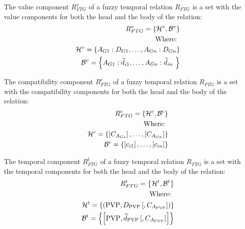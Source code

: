 \begin{definition}
\label{def:value-component}
The value component $R^{v}_{FTG}$ of a fuzzy temporal relation $R_{FTG}$ is a set with the value components for both the head and the body of the relation:
\begin{align}
\label{eq:value-component}
R^{v}_{FTG} = \left \lbrace \mathcal{H}^{v},\mathcal{B}^{v} \right \rbrace \\
\nonumber
\text{Where: } \\
\nonumber
\mathcal{H}^{v} = \left \lbrace A_{G1}:D_{G1}, \ldots,  A_{Gn}:D_{Gn} \right \rbrace \\
\nonumber
\mathcal{B}^ {v} = \left \lbrace A_{G1}:\widetilde{d}_{i1}, \ldots,  A_{Gn}:\widetilde{d}_{in}\ \right \rbrace \\
\end{align}
\end{definition}

\begin{definition}
\label{def:compatibility-component}
The compatibility component $R^{c}_{FTG}$ of a fuzzy temporal relation $R_{FTG}$ is a set with the compatibility components for both the head and the body of the relation:
\begin{align}
\label{eq:compatibility-component}
R^{c}_{FTG} = \left \lbrace \mathcal{H}^{c},\mathcal{B}^{c} \right \rbrace \\
\nonumber
\text{Where: } \\
\nonumber
\mathcal{H}^{c} = \left \lbrace \left[C_{A_{G1}} \right], \ldots,  \left[C_{A_{Gn}} \right] \right \rbrace \\
\nonumber
\mathcal{B}^ {c} = \left \lbrace \left[ c_{i1} \right], \ldots, \left[ c_{in} \right] \right \rbrace \\
\end{align}
\end{definition}


\begin{definition}
\label{def:temporal-component}
The temporal component $R^{t}_{FTG}$ of a fuzzy temporal relation $R_{FTG}$ is a set with the temporal components for both the head and the body of the relation:
\begin{align}
\label{eq:temporal-component}
R^{t}_{FTG} = \left \lbrace \mathcal{H}^{t},\mathcal{B}^{t} \right \rbrace \\
\nonumber
\text{Where: } \\
\nonumber
\mathcal{H}^{t} = \left \lbrace \left( \text{PVP}, D_{\text{PVP}}\left[,C_{A_{\text{PVP}}} \right] \right) \right \rbrace \\
\nonumber
\mathcal{B}^ {t} = \left \lbrace  \left[ \text{PVP}, \widetilde{d}_{\text{PVP}} \left[,C_{A_{\text{PVP}}} \right] \right]  \right \rbrace \\
\end{align}
\end{definition}

